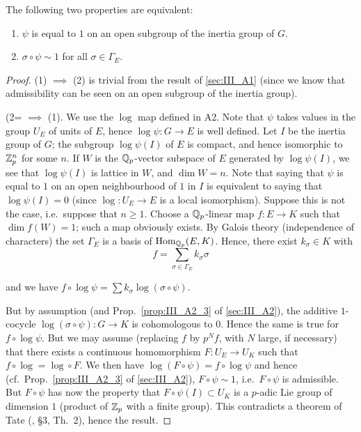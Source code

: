 \begin{subappendices}
\dpage

\begin{prop}\label{prop:III_A3_3}
The following two properties are equivalent:
\begin{enumerate}[(1)]
\item $\psi$ is equal to $1$ on an open subgroup of the inertia group of $G$.
\item $\sigma \circ \psi \sim 1$ for all $\sigma \in \Gamma_E$.
\end{enumerate}
\end{prop}

\begin{proof}
(1) $\implies$ (2) is trivial from the result of \ref{sec:III_A1} (since we know that
admissibility can be seen on an open subgroup of the inertia group).

(2= $\implies$ (1). We use the $\log$ map defined in A2. Note that $\psi$ takes
values in the group $U_E$ of units of $E$, hence $\log \psi \colon G \to E$ is
well defined. Let $I$ be the inertia group of $G$; the subgroup $\log \psi(I)$
of $E$ is compact, and hence isomorphic to $\mathbb{Z}_p^n$ for some $n$. If $W$ is the
$\mathbb{Q}_p$-vector subspace of $E$ generated by $\log \psi(I)$, we see that $\log
\psi(I)$ is lattice in $W$, and $\dim W = n$. Note that saying that $\psi$ is
equal to $1$ on an open neighbourhood of $1$ in $I$ is equivalent to saying that
$\log \psi(I) = 0$ (since $\log \colon U_E \to E$ is a local isomorphism).
Suppose this is not the case, i.e.\ suppose that $n \geq 1$. Choose a
$\mathbb{Q}_p$-linear map $f \colon  E \to K$ such that $\dim f(W) = 1$; such a map
obviously exists. By Galois theory (independence of characters) the set
$\Gamma_E$ is a basis of $\operatorname{Hom}_{\mathbb{Q}_p} (E,K)$. Hence, there exist $k_\sigma \in
K$ with
\[
f = \sum_{\sigma \in \Gamma_E} k_\sigma \sigma
\]

and we have $f \circ \log \psi = \sum k_\sigma \log(\sigma \circ \psi)$.

\dpage

But by assumption (and Prop.~\ref{prop:III_A2_3} of \ref{sec:III_A2}), the
additive $1$-cocycle $\log(\sigma \circ \psi) \colon  G \to K$ is cohomologous
to $0$. Hence the same is true for $ f \circ \log \psi$.
But we may assume (replacing $f$ by $p^Nf$,  with $N$ large, if necessary) that
there exists a continuous homomorphism $F \colon U_E \to U_K$ such that $f
\circ \log = \log \circ F$.
We then have $\log (F \circ \psi) = f \circ \log \psi$ and hence (cf.\
Prop.~\ref{prop:III_A2_3} of \ref{sec:III_A2}), $F \circ \psi \sim 1$, i.e.\ $F
\circ \psi$ is admissible.
But $F \circ \psi$ has now the property that $F \circ \psi(I) \subset U_K$ is a
$p$-adic Lie group of dimension $1$ (product of $\mathbb{Z}_p$ with a finite group).
This contradicts a theorem of Tate (\cite{39}, \S3, Th.~2), hence the result.
\end{proof}


\end{subappendices}
